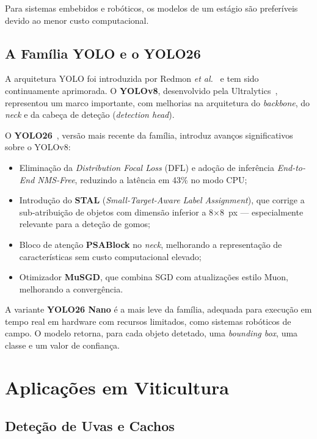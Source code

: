 Para sistemas embebidos e robóticos, os modelos de um estágio são
preferíveis devido ao menor custo computacional.

\subsection{A Família YOLO e o YOLO26}

A arquitetura YOLO foi introduzida por Redmon \textit{et al.}~\cite{redmon2016you}
e tem sido continuamente aprimorada. O \textbf{YOLOv8}, desenvolvido pela
Ultralytics~\cite{jocher2023ultralytics}, representou um marco importante,
com melhorias na arquitetura do \textit{backbone}, do \textit{neck} e da
cabeça de deteção (\textit{detection head}).

O \textbf{YOLO26}~\cite{hidayatullah2026yolo26}, versão mais recente da
família, introduz avanços significativos sobre o YOLOv8:

\begin{itemize}
  \item Eliminação da \textit{Distribution Focal Loss} (DFL) e adoção de
    inferência \textit{End-to-End NMS-Free}, reduzindo a latência em 43\%
    no modo CPU;
  \item Introdução do \textbf{STAL} (\textit{Small-Target-Aware Label
    Assignment}), que corrige a sub-atribuição de objetos com dimensão
    inferior a 8$\times$8~px — especialmente relevante para a deteção de
    gomos;
  \item Bloco de atenção \textbf{PSABlock} no \textit{neck}, melhorando
    a representação de características sem custo computacional elevado;
  \item Otimizador \textbf{MuSGD}, que combina SGD com atualizações
    estilo Muon, melhorando a convergência.
\end{itemize}

A variante \textbf{YOLO26 Nano} é a mais leve da família, adequada para
execução em tempo real em hardware com recursos limitados, como sistemas
robóticos de campo. O modelo retorna, para cada objeto detetado, uma
\textit{bounding box}, uma classe e um valor de confiança.

\section{Aplicações em Viticultura}

\subsection{Deteção de Uvas e Cachos}

